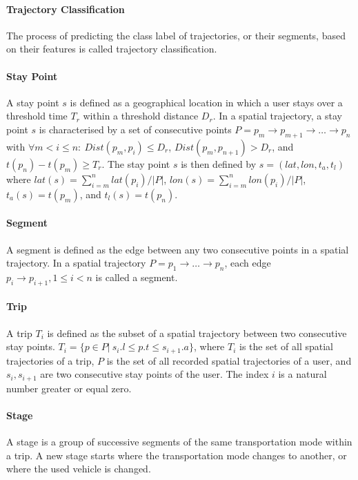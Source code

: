 \paragraph{Trajectory Classification} The process of predicting the class label of trajectories, or their segments, based on their features is called trajectory classification. \cite{lee2008traclass}

\paragraph{Stay Point} A stay point $s$ is defined as a geographical location in which a user stays over a threshold time $T_r$ within a threshold distance $D_r$. In a spatial trajectory, a stay point $s$ is characterised by a set of consecutive points $P=p_m \rightarrow p_{m+1} \rightarrow \dots \rightarrow p_n$ with $\forall m<i\leq n:\: Dist(p_m, p_i) \leq D_r$, $Dist(p_m, p_{n+1}) > D_r $, and $t(p_n) - t(p_m) \geq T_r$. The stay point $s$ is then defined by $s=(lat, lon, t_a, t_l)$ where $lat(s) = \sum^{n}_{i=m}lat(p_i) /|P|$, $lon(s) = \sum^{n}_{i=m}lon(p_i)/|P|$, $t_a(s) = t(p_m)$, and $t_l(s) = t(p_n)$. \cite{Zheng2007}

\paragraph{Segment} A segment is defined as the edge between any two consecutive points in a spatial trajectory. In a spatial trajectory $P=p_1 \rightarrow \dots \rightarrow p_n$, each edge $p_i\rightarrow p_{i+1}, 1\leq i < n$ is called a segment. \cite{Zheng:2015:TDM:2764959.2743025}

\paragraph{Trip} A trip $T_i$ is defined as the subset of a spatial trajectory between two consecutive stay points. $T_i = \{p \in P |\: s_i.l \leq p.t \leq s_{i+1}.a \}$, where $T_i$ is the set of all spatial trajectories of a trip, $P$ is the set of all recorded spatial trajectories of a user, and $s_i, s_{i+1}$ are two consecutive stay points of the user. The index $i$ is a natural number greater or equal zero.  \cite{Zheng2008}

\paragraph{Stage} A stage is a group of successive segments of the same transportation mode within a trip. A new stage starts where the transportation mode changes to another, or where the used vehicle is changed. \cite{Bolbol2012}

